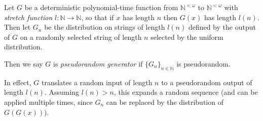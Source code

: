 \documentclass[12pt]{article}
\begin{document}
Let $G$ be a deterministic polynomial-time function from $\mathbb{N}^{<\omega}$ to $\mathbb{N}^{<\omega}$ with \emph{stretch function} $l:\mathbb{N}\rightarrow\mathbb{N}$, so that if $x$ has length $n$ then $G(x)$ has length $l(n)$.  Then let $G_n$ be the distribution on strings of length $l(n)$ defined by the output of $G$ on a randomly selected string of length $n$ selected by the uniform distribution.

Then we say $G$ is \emph{pseudorandom generator} if $\{G_n\}_{n\in\mathbb{N}}$ is pseudorandom.

In effect, $G$ translates a random input of length $n$ to a pseudorandom output of length $l(n)$.  Assuming $l(n)>n$, this expands a random sequence (and can be applied multiple times, since $G_n$ can be replaced by the distribution of $G(G(x))$).
\end{document}
